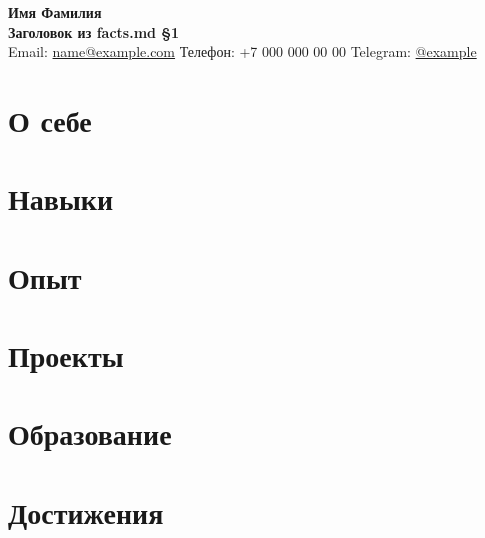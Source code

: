 \documentclass[a4paper,10pt]{article}
\makeatletter
\newcommand{\CVName}{Имя Фамилия}
\newcommand{\CVTitle}{Заголовок из facts.md §1}
\newcommand{\CVEmail}{name@example.com}
\newcommand{\CVPhone}{+7 000 000 00 00}
\newcommand{\CVTelegram}{example}
\makeatother
\begin{document}
{\LARGE \textbf{\CVName}}\\
\textbf{\CVTitle}\\
Email: \href{mailto:\CVEmail}{\CVEmail} \quad
Телефон: \CVPhone \quad
Telegram: \href{https://t.me/\CVTelegram}{@\CVTelegram}

\section*{О себе}

\section*{Навыки}

\section*{Опыт}

\section*{Проекты}

\section*{Образование}

\section*{Достижения}
\end{document}
